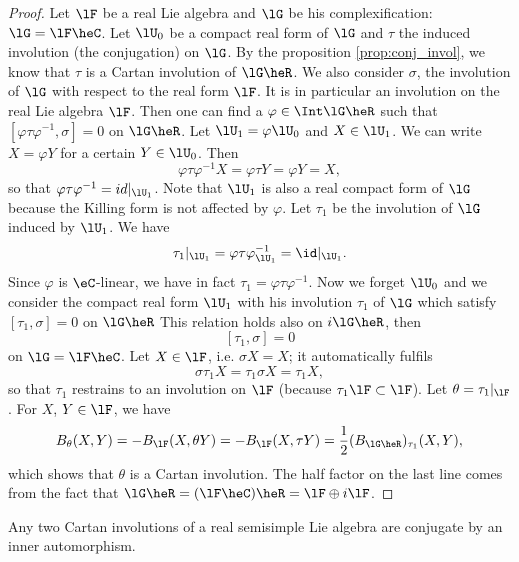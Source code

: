 \begin{proof}
Let $\lF$ be a real Lie algebra and $\lG$ be his complexification: $\lG=\lF\heC$. Let $\lU_0$ be a compact real form of $\lG$ and $\tau$ the induced involution (the conjugation) on $\lG$. By the proposition \ref{prop:conj_invol}, we know that $\tau$ is  a Cartan involution of $\lG\heR$. We also consider $\sigma$, the involution of $\lG$ with respect to the real form $\lF$. It is in particular an involution on the real Lie algebra $\lF$. Then one can find a $\varphi\in\Int\lG\heR$ such that $[\varphi\tau\varphi^{-1},\sigma]=0$ on $\lG\heR$. Let $\lU_1=\varphi\lU_0$ and $X\in\lU_1$. We can write $X=\varphi Y$ for a certain $Y\in\lU_0$. Then
\[
   \varphi\tau\varphi^{-1} X=\varphi\tau Y=\varphi Y=X,
\]
so that $\varphi\tau\varphi^{-1}=id|_{\lU_1}$. Note that $\lU_1$ is also a real compact form of $\lG$ because the Killing form is not affected by $\varphi$. Let $\tau_1$ be the involution of $\lG$ induced by $\lU_1$. We have
\[
   \tau_1|_{\lU_1}=\varphi\tau\varphi^{-1}_{\lU_1}=\id|_{\lU_1}.
\]
Since $\varphi$ is $\eC$-linear, we have in fact $\tau_1=\varphi\tau\varphi^{-1}$. Now we forget $\lU_0$ and we consider the compact real form $\lU_1$ with his involution $\tau_1$ of $\lG$ which satisfy $[\tau_1,\sigma]=0$ on $\lG\heR$ This relation holds also on $i\lG\heR$, then 
\[
   [\tau_1,\sigma]=0
\]
on $\lG=\lF\heC$. Let $X\in\lF$, i.e. $\sigma X=X$; it automatically fulfils 
\[
  \sigma\tau_1 X=\tau_1\sigma X=\tau_1 X,
\]
so that $\tau_1$ restrains to an involution on $\lF$ (because $\tau_1\lF\subset\lF$). Let $\theta=\tau_1|_{\lF}$. For $X$, $Y\in\lF$, we have
\begin{equation}
B_{\theta}(X,Y)=-B_{\lF}(X, \theta Y)
             =-B_{\lF}(X,\tau Y)
         =\frac{1}{2}(B_{\lG\heR})_{\tau_1}(X,Y),
\end{equation}
which shows that $\theta$ is a Cartan involution. The half factor on the last line comes from the fact that $\lG\heR=(\lF\heC)\heR=\lF\oplus i\lF$.

\end{proof}

\begin{corollary}
Any two Cartan involutions of a real semisimple Lie algebra are conjugate by an inner automorphism. 
\label{cor:Cartan_conj_inner}
\end{corollary}

